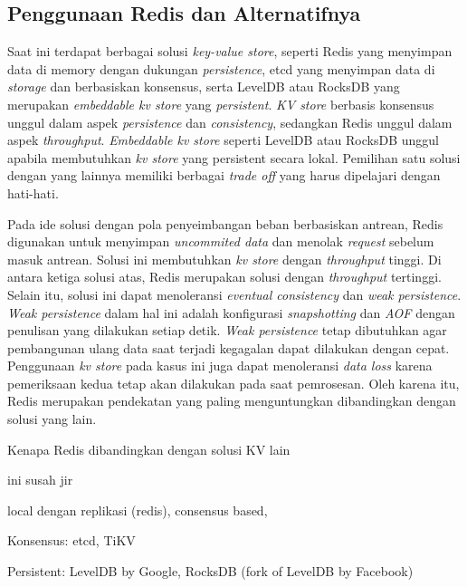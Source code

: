 \subsection{Penggunaan Redis dan Alternatifnya}

Saat ini terdapat berbagai solusi \textit{key-value store}, seperti Redis yang menyimpan data di memory dengan dukungan \textit{persistence}, etcd yang menyimpan data di \textit{storage} dan berbasiskan konsensus, serta LevelDB atau RocksDB yang merupakan \textit{embeddable kv store} yang \textit{persistent}. \textit{KV store} berbasis konsensus unggul dalam aspek \textit{persistence} dan \textit{consistency}, sedangkan Redis unggul dalam aspek \textit{throughput}. \textit{Embeddable kv store} seperti LevelDB atau RocksDB unggul apabila membutuhkan \textit{kv store} yang persistent secara lokal. Pemilihan satu solusi dengan yang lainnya memiliki berbagai \textit{trade off} yang harus dipelajari dengan hati-hati.

Pada ide solusi dengan pola penyeimbangan beban berbasiskan antrean, Redis digunakan untuk menyimpan \textit{uncommited data} dan menolak \textit{request} sebelum masuk antrean. Solusi ini membutuhkan \textit{kv store} dengan \textit{throughput} tinggi. Di antara ketiga solusi atas, Redis merupakan solusi dengan \textit{throughput} tertinggi. Selain itu, solusi ini dapat menoleransi \textit{eventual consistency} dan \textit{weak persistence}. \textit{Weak persistence} dalam hal ini adalah konfigurasi \textit{snapshotting} dan \textit{AOF} dengan penulisan yang dilakukan setiap detik. \textit{Weak persistence} tetap dibutuhkan agar pembangunan ulang data saat terjadi kegagalan dapat dilakukan dengan cepat. Penggunaan \textit{kv store} pada kasus ini juga dapat menoleransi \textit{data loss} karena pemeriksaan kedua tetap akan dilakukan pada saat pemrosesan. Oleh karena itu, Redis merupakan pendekatan yang paling menguntungkan dibandingkan dengan solusi yang lain.



Kenapa Redis dibandingkan dengan solusi KV lain

ini susah jir

local dengan replikasi (redis), consensus based,

Konsensus: etcd, TiKV

Persistent: LevelDB by Google, RocksDB (fork of LevelDB by Facebook)
